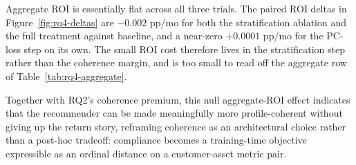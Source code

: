 Aggregate ROI is essentially flat across all three trials. The paired ROI deltas in Figure~\ref{fig:rq4-deltas} are $-0.002$ pp/mo for both the stratification ablation and the full treatment against baseline, and a near-zero $+0.0001$ pp/mo for the PC-loss step on its own. The small ROI cost therefore lives in the stratification step rather than the coherence margin, and is too small to read off the aggregate row of Table~\ref{tab:rq4-aggregate}.

Together with RQ2's coherence premium, this null aggregate-ROI effect indicates that the recommender can be made meaningfully more profile-coherent without giving up the return story, reframing coherence as an architectural choice rather than a post-hoc tradeoff: compliance becomes a training-time objective expressible as an ordinal distance on a customer-asset metric pair.
